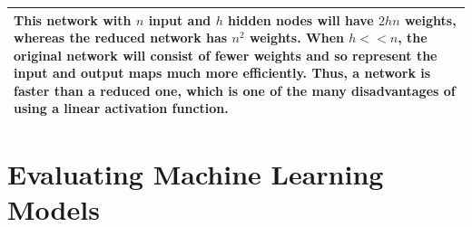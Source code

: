 \documentclass[10pt]{article}
\newenvironment{answer}
    {\begin{center}
    \begin{tabular}{|p{0.9\textwidth}|}
    \hline
    }
    { 
    \\\hline
    \end{tabular} 
    \end{center}
    }
\begin{document}
\begin{enumerate}[resume]
\begin{enumerate}
        \begin{answer}
          This network with $n$ input and $h$ hidden nodes will have $2hn$ weights, whereas the reduced network has $n^2$ weights. When $h << n$, the original network will consist of fewer weights and so represent the input and output maps much more efficiently. Thus, a network is faster than a reduced one, which is one of the many disadvantages of using a linear activation function.
        \end{answer}
    \end{enumerate}
  \end{enumerate}
  
  \section*{Evaluating Machine Learning Models}
\end{document}
